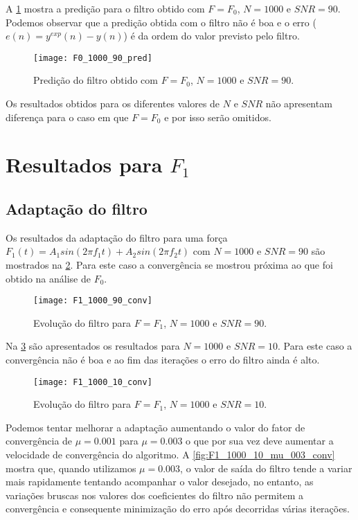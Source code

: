A \cref{fig:F0_1000_90_pred} mostra a predição para o filtro obtido com $ F=F_0 $, $ N=1000 $ e $ SNR=90 $. Podemos observar que a predição obtida com o filtro não é boa e o erro ($ e(n)=y^{exp}(n) - y(n) $) é da ordem do valor previsto pelo filtro.

\begin{figure}[h]
	\centering
	\texttt{[image: F0\_1000\_90\_pred]}
	\caption{Predição do filtro obtido com $ F=F_0 $, $ N=1000 $ e $ SNR=90 $.}
	\label{fig:F0_1000_90_pred}
\end{figure}

Os resultados obtidos para os diferentes valores de $ N $ e $ SNR $ não apresentam diferença para o caso em que $ F=F_0 $ e por isso serão omitidos.

\section{Resultados para $ F_1 $}
\subsection{Adaptação do filtro}

Os resultados da adaptação do filtro para uma força $F_1(t) = A_1 sin(2\pi f_1 t) + A_2 sin(2\pi f_2 t)$  com $ N=1000 $  e $ SNR = 90 $ são mostrados na \cref{fig:F1_1000_90_conv}. Para este caso a convergência se mostrou próxima ao que foi obtido na análise de $ F_0 $. 

\begin{figure}
	\centering
	\texttt{[image: F1\_1000\_90\_conv]}
	\caption{Evolução do filtro para $ F=F_1 $, $ N=1000 $ e $ SNR=90 $.}
	\label{fig:F1_1000_90_conv}
\end{figure}

Na \cref{fig:F1_1000_10_conv} são apresentados os resultados para $ N=1000 $ e $ SNR=10 $. Para este caso a convergência não é boa e ao fim das iterações o erro do filtro ainda é alto. 

\begin{figure}
	\centering
	\texttt{[image: F1\_1000\_10\_conv]}
	\caption{Evolução do filtro para $ F=F_1 $, $ N=1000 $ e $ SNR=10 $.}
	\label{fig:F1_1000_10_conv}
\end{figure}

Podemos tentar melhorar a adaptação aumentando o valor do fator de convergência de $ \mu=0.001 $ para $ \mu=0.003 $ o que por sua vez deve aumentar a velocidade de convergência do algoritmo. A \cref{fig:F1_1000_10_mu_003_conv} mostra que, quando utilizamos $ \mu = 0.003 $, o valor de saída do filtro tende a variar mais rapidamente tentando acompanhar o valor desejado, no entanto, as variações bruscas nos valores dos coeficientes do filtro não permitem a convergência e consequente minimização do erro após decorridas várias iterações. 

